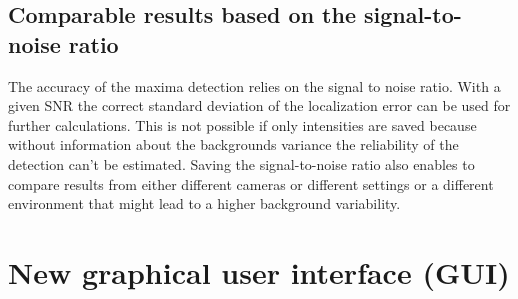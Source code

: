 \subsection{Comparable results based on the signal-to-noise ratio}
The accuracy of the maxima detection relies on the signal to noise ratio. With a given SNR the correct standard deviation of the localization error can be used for further calculations. This is not possible if only intensities are saved because without information about the backgrounds variance the reliability of the detection can't be estimated.\newline
Saving the signal-to-noise ratio also enables to compare results from either different cameras or different settings or a different environment that might lead to a higher background variability.  


\section{New graphical user interface (GUI)}
